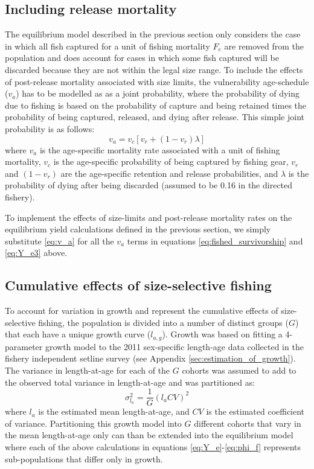 \subsection*{Including release mortality} %
\label{sub:including_release_mortality}
The equilibrium model described in the previous section only considers the case in which all fish captured for a unit of fishing mortality $F_e$ are removed from the population and does account for cases in which some fish captured will be discarded because they are not within the legal size range.  To include the effects of post-release mortality associated with size limits, the vulnerability age-schedule ($v_a$) has to be modelled as as a joint probability, where the probability of dying due to fishing is based on the probability of capture and being retained times the probability of being captured, released, and dying after release.  This simple joint probability is as follows:
\begin{equation} \label{eq:v_a}
	v_a = v_c[v_r + (1-v_r)\lambda]
\end{equation}
where $v_a$ is the age-specific mortality rate associated with a unit of fishing mortality, $v_c$ is the age-specific probability of being captured by fishing gear, $v_r$ and $(1-v_r)$ are the age-specific retention and release probabilities, and $\lambda$ is the probability of dying after being discarded (assumed to be 0.16 in the directed fishery).

To implement the effects of size-limits and post-release mortality rates on the equilibrium yield calculations defined in the previous section, we simply substitute \eqref{eq:v_a} for all the $v_a$ terms in equations \ref{eq:fished_survivorship} and \ref{eq:Y_e3} above.

\subsection*{Cumulative effects of size-selective fishing} %
\label{sub:cumulative_effects_of_size_selective_fishing}
To account for variation in growth and represent the cumulative effects of size-selective fishing, the population is divided into a number of distinct groups ($G$) that each have a unique growth curve ($l_{a,g}$).  Growth was based on fitting a 4-parameter growth model to the 2011 sex-specific length-age data collected in the fishery independent setline survey (see Appendix \ref{sec:estimation_of_growth}). The variance in length-at-age for each of the $G$ cohorts was assumed to add to the observed total variance in length-at-age and was partitioned as:
\[
 \sigma_{l_a}^2 = \frac{1}{G} (l_a CV)^2
\]
where $l_a$ is the estimated mean length-at-age, and $CV$ is the estimated coefficient of variance.  Partitioning this growth model into $G$ different cohorts that vary in the mean length-at-age only can than be extended into the equilibrium model where each of the above calculations in equations \eqref{eq:Y_e}-\eqref{eq:phi_f} represents sub-populations that differ only in growth.

